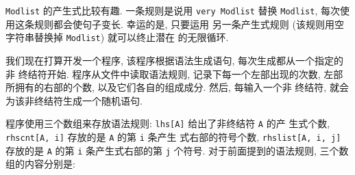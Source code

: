 \texttt{Modlist} 的产生式比较有趣. 一条规则是说用 \texttt{very Modlist}
替换 \texttt{Modlist}, 每次使用这条规则都会使句子变长. 幸运的是, 只要运用
另一条产生式规则 (该规则用空字符串替换掉 \texttt{Modlist}) 就可以终止潜在
的无限循环.

我们现在打算开发一个程序, 该程序根据语法生成语句, 每次生成都从一个指定的非
终结符开始. 程序从文件中读取语法规则, 记录下每一个左部出现的次数, 
左部所拥有的右部的个数, 以及它们各自的组成成分. 然后, 每输入一个非
终结符, 就会为该非终结符生成一个随机语句.

程序使用三个数组来存放语法规则:
\texttt{lhs[A]} 给出了非终结符 \texttt{A} 的产 
生式个数, \texttt{rhscnt[A, i]} 存放的是 \texttt{A} 的第 \texttt{i} 条产生
式右部的符号个数, \texttt{rhslist[A, i, j]} 存放的是 \texttt{A} 的第 
\texttt{i} 条产生式右部的第 \texttt{j} 个符号. 对于前面提到的语法规则, 
三个数组的内容分别是:

